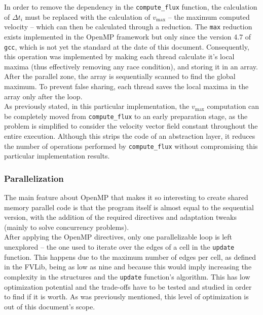\documentclass[9pt,twocolumn]{scrartcl}
\begin{document}
In order to remove the dependency in the \texttt{compute\_flux} function, the calculation of $\Delta t_{i}$ must be replaced with the calculation of $v_{\mathrm{max}}$ -- the maximum computed velocity -- which can then be calculated through a reduction. The \texttt{max} reduction exists implemented in the OpenMP framework but only since the version 4.7 of \texttt{gcc}, which is not yet the standard at the date of this document. Consequently, this operation was implemented by making each thread calculate it's local maxima (thus effectively removing any race condition), and storing it in an array. After the parallel zone, the array is sequentially scanned to find the global maximum. To prevent false sharing, each thread saves the local maxima in the array only after the loop.\\

As previously stated, in this particular implementation, the $v_{\mathrm{max}}$ computation can be completely moved from \texttt{compute\_flux} to an early preparation stage, as the problem is simplified to consider the velocity vector field constant throughout the entire execution. Although this strips the code of an abstraction layer, it reduces the number of operations performed by \texttt{compute\_flux} without compromising this particular implementation results.\\

\subsubsection{Parallelization}
The main feature about OpenMP that makes it so interesting to create shared memory parallel code is that the program itself is almost equal to the sequential version, with the addition of the required directives and adaptation tweaks (mainly to solve concurrency problems).\\

After applying the OpenMP directives, only one parallelizable loop is left unexplored -- the one used to iterate over the edges of a cell in the \texttt{update} function. This happens due to the maximum number of edges per cell, as defined in the FVLib, being as low as nine and because this would imply increasing the complexity in the structures and the \texttt{update} function's algorithm. This has low optimization potential and the trade-offs have to be tested and studied in order to find if it is worth. As was previously mentioned, this level of optimization is out of this document's scope.\\
\end{document}

